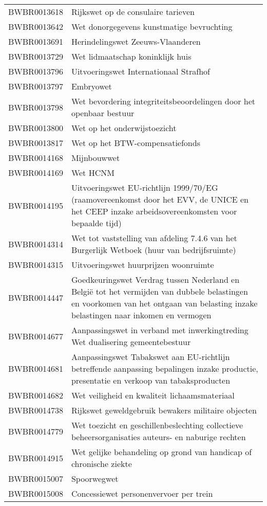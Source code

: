 \begin{longtable}{lp{}}
BWBR0013618 & Rijkswet op de consulaire tarieven \\
BWBR0013642 & Wet donorgegevens kunstmatige bevruchting \\
BWBR0013691 & Herindelingswet Zeeuws-Vlaanderen \\
BWBR0013729 & Wet lidmaatschap koninklijk huis \\
BWBR0013796 & Uitvoeringswet Internationaal Strafhof \\
BWBR0013797 & Embryowet \\
BWBR0013798 & Wet bevordering integriteitsbeoordelingen door het openbaar bestuur \\
BWBR0013800 & Wet op het onderwijstoezicht \\
BWBR0013817 & Wet op het BTW-compensatiefonds \\
BWBR0014168 & Mijnbouwwet \\
BWBR0014169 & Wet HCNM \\
BWBR0014195 & Uitvoeringswet EU-richtlijn 1999/70/EG (raamovereenkomst door het EVV, de UNICE en het CEEP inzake arbeidsovereenkomsten voor bepaalde tijd) \\
BWBR0014314 & Wet tot vaststelling van afdeling 7.4.6 van het Burgerlijk Wetboek (huur van bedrijfsruimte) \\
BWBR0014315 & Uitvoeringswet huurprijzen woonruimte \\
BWBR0014447 & Goedkeuringswet Verdrag tussen Nederland en België tot het vermijden van dubbele belastingen en voorkomen van het ontgaan van belasting inzake belastingen naar inkomen en vermogen \\
BWBR0014677 & Aanpassingswet in verband met inwerkingtreding Wet dualisering gemeentebestuur \\
BWBR0014681 & Aanpassingswet Tabakswet aan EU-richtlijn betreffende aanpassing bepalingen inzake productie, presentatie en verkoop van tabaksproducten \\
BWBR0014682 & Wet veiligheid en kwaliteit lichaamsmateriaal \\
BWBR0014738 & Rijkswet geweldgebruik bewakers militaire objecten \\
BWBR0014779 & Wet toezicht en geschillenbeslechting collectieve beheersorganisaties auteurs- en naburige rechten \\
BWBR0014915 & Wet gelijke behandeling op grond van handicap of chronische ziekte \\
BWBR0015007 & Spoorwegwet \\
BWBR0015008 & Concessiewet personenvervoer per trein \\

\end{longtable}
